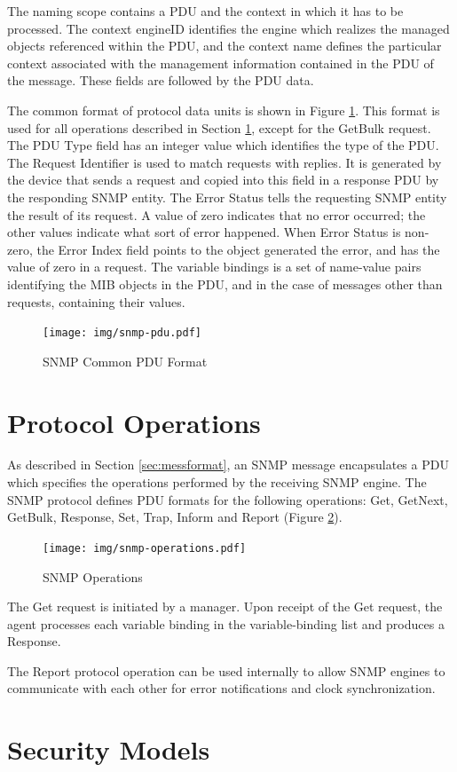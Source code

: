 The naming scope contains a PDU and the context in which it has to be processed. The context engineID identifies the engine which realizes the managed objects referenced within the PDU, and the context name defines the particular context associated with the management information contained in the PDU of the message. These fields are followed by the PDU data.

The common format of protocol data units is shown in Figure \ref{fig:snmp-pdu}. This format is used for all operations described in Section \ref{sec:opetations}, except for the GetBulk request. The PDU Type field has an integer value which identifies the type of the PDU. The Request Identifier is used to match requests with replies. It is generated by the device that sends a request and copied into this field in a response PDU by the responding SNMP entity. The Error Status tells the requesting SNMP entity the result of its request. A value of zero indicates that no error occurred; the other values indicate what sort of error happened. When Error Status is non-zero, the Error Index field points to the object generated the error, and has the value of zero in a request. The variable bindings is a set of name-value pairs identifying the MIB objects in the PDU, and in the case of messages other than requests, containing their values.
\begin{figure}[htp]	
\begin{center}
    \texttt{[image: img/snmp-pdu.pdf]}
    \caption{SNMP Common PDU Format}   
	\label{fig:snmp-pdu}
\end{center}
\end{figure}


\section{Protocol Operations}\label{sec:opetations}
As described in Section \ref{sec:messformat}, an SNMP message encapsulates a PDU which specifies the operations performed by the receiving SNMP engine. The SNMP protocol defines PDU formats for the following operations: Get, GetNext, GetBulk, Response, Set, Trap, Inform and Report (Figure \ref{fig:snmp-operations}). 

\begin{figure}[htp]	
\begin{center}
	\label{fig:snmp-operations}
    \texttt{[image: img/snmp-operations.pdf]}
    \caption{SNMP Operations}   
\end{center}
\end{figure}


The Get request is initiated by a manager. Upon receipt of the Get request, the agent processes each variable binding in the variable-binding list and produces a Response.

The Report protocol operation can be used internally to allow SNMP engines to communicate with each other for error notifications and clock synchronization.



\section{Security Models}

